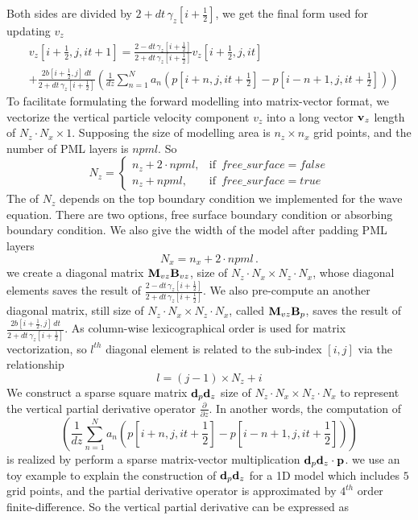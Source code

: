 \documentclass[revised,endfloat]{geophysics}
\begin{document}
Both sides are divided by $2+ dt\, \gamma_z[i+\frac{1}{2}]$, we get the final form used for updating $v_z$
\begin{equation}
\begin{split}
& v_z[i+\frac{1}{2},j,it+1] =  \frac{2- dt\, \gamma_z[i+\frac{1}{2}]}{2+ dt\, \gamma_z[i+\frac{1}{2}]}v_z[i+\frac{1}{2},j,it] \\
&+ \frac{2b[i+\frac{1}{2},j] \, dt}{2+ dt\, \gamma_z[i+\frac{1}{2}]}
\left(\frac{1}{dz} \sum_{n=1}^N  a_n \left( p[i+n,j,it+\frac{1}{2}] - p[i-n+1,j,it+\frac{1}{2}] \right)  \right)
\end{split}
\label{eq7}
\end{equation}
To facilitate formulating the forward modelling into matrix-vector format, we vectorize the vertical particle velocity component $v_z$ into a long vector ${\bf v}_z$ length of $N_z \cdot N_x \times 1$. Supposing the size of modelling area is $n_z \times n_x$ grid points, and the number of PML layers is $npml$. So 
\begin{equation}
N_z = \begin{cases}
    n_z + 2 \cdot npml ,& \text{if}\,\,\, free\_surface=false \\
    n_z + npml  ,            & \text{if}\,\,\, free\_surface=true
\end{cases}
\label{eq8}
\end{equation}
The of $N_z$ depends on the top boundary condition we implemented for the wave equation. There are two options, free surface boundary condition or absorbing boundary condition. We also give the width of the model after padding PML layers
\begin{equation}
N_x = n_x + 2 \cdot npml\,.
\label{eq9}
\end{equation}
we create a diagonal matrix ${\bf M}_{vz}{\bf B}_{vz}$, size of $N_z \cdot N_x \times N_z \cdot N_x$,  whose diagonal elements saves the result of $\frac{2- dt\, \gamma_z[i+\frac{1}{2}]}{2+ dt\, \gamma_z[i+\frac{1}{2}]}$. We also pre-compute an another diagonal matrix, still size of $N_z \cdot N_x \times N_z \cdot N_x$, called ${\bf M}_{vz}{\bf B}_p$, saves the result of $\frac{2b[i+\frac{1}{2},j] \, dt}{2+ dt\, \gamma_z[i+\frac{1}{2}]}$.
As column-wise lexicographical order is used for matrix vectorization, so $l^{th}$ diagonal element is related to the sub-index $[i,j]$ via the relationship 
$$
l = (j-1)\times N_z + i
$$
We construct a sparse square matrix ${\bf d}_p{\bf d}_z$ size of $N_z \cdot N_x \times N_z \cdot N_x$ to represent the vertical partial derivative operator $\frac{\partial }{\partial z}$. In another words, the computation of $$\left(\frac{1}{dz} \sum_{n=1}^N  a_n \left( p[i+n,j,it+\frac{1}{2}] - p[i-n+1,j,it+\frac{1}{2}] \right)  \right)$$ is realized by perform a sparse matrix-vector multiplication ${\bf d}_p{\bf d}_z \cdot {\bf p}$. we use an toy example to explain the construction of ${\bf d}_p{\bf d}_z$ for a 1D model which includes $5$ grid points, and the partial derivative operator is approximated by $4^{th}$ order finite-difference. So the vertical partial derivative can be expressed as
\end{document}
